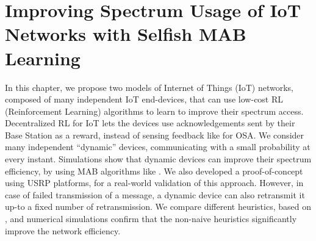 
\chapter{Improving Spectrum Usage of IoT Networks with Selfish MAB Learning}
\label{chapter:4}

\graphicspath{{2-Chapters/4-Chapter/Images/}}


\abstractStartChapter{}%
%
In this chapter, we propose two models of Internet of Things (IoT) networks, composed of many independent IoT end-devices,
that can use low-cost RL (Reinforcement Learning) algorithms to learn to improve their spectrum access.
%
Decentralized RL for IoT lets the devices use acknowledgements sent by their Base Station as a reward, instead of sensing feedback like for OSA.
We consider many independent ``dynamic'' devices, communicating with a small probability at every instant.
Simulations show that dynamic devices can improve their spectrum efficiency,
by using MAB algorithms like \UCB.
We also developed a proof-of-concept using USRP platforms, for a real-world validation of this approach.
%
%
However, in case of failed transmission of a message, a dynamic device can also retransmit it up-to a fixed number of retransmission.
We compare different heuristics, based on \UCB, and numerical simulations confirm that the non-naive heuristics significantly improve the network efficiency.
%

\minitocStartChapter{}

